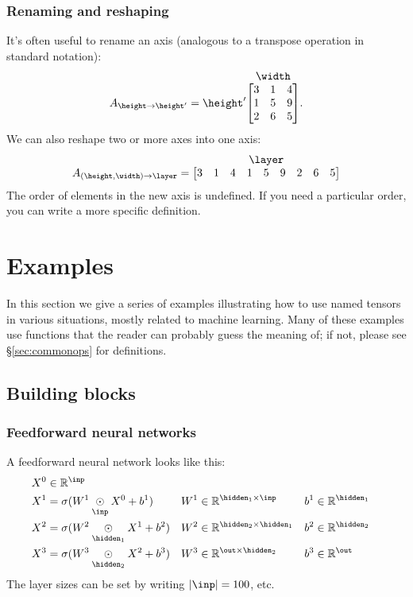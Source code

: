 \documentclass{article}
\makeatletter
\newcommand{\nmatrix}[3]{#1\begin{array}[b]{@{}c@{}}#2\\\begin{bmatrix}#3\end{bmatrix}\end{array}}
\makeatother
\begin{document}
\subsubsection{Renaming and reshaping}

It's often useful to rename an axis (analogous to a transpose operation in standard notation):
\begin{equation*}
A_{\height\rightarrow\height'} = \nmatrix{\height'}{\width}{
  3 & 1 & 4 \\
  1 & 5 & 9 \\
  2 & 6 & 5 \\
}.
\end{equation*}
We can also reshape two or more axes into one axis:
\begin{equation*}
  A_{(\height,\width)\rightarrow\layer} = \nmatrix{}{\layer}{
    3 & 1 & 4 & 1 & 5 & 9 & 2 & 6 & 5
  }
\end{equation*}
The order of elements in the new axis is undefined. If you need a particular order, you can write a more specific definition.

\section{Examples}
\label{sec:examples}

In this section we give a series of examples illustrating how to use named tensors in various situations, mostly related to machine learning. Many of these examples use functions that the reader can probably guess the meaning of; if not, please see \S\ref{sec:commonops} for definitions.

\subsection{Building blocks}

\subsubsection{Feedforward neural networks}

A feedforward neural network looks like this:
\begin{align*}
  X^0 &\in \mathbb{R}^{\inp} \\
  X^1 &= \sigma(W^1 \ndot{\inp} X^0 + b^1) & W^1 &\in \mathbb{R}^{\hidden_1 \times \inp} & b^1 &\in \mathbb{R}^{\hidden_1} \\
  X^2 &= \sigma(W^2 \ndot{\hidden_1} X^1 + b^2) & W^2 &\in \mathbb{R}^{\hidden_2 \times \hidden_1} & b^2 &\in \mathbb{R}^{\hidden_2} \\
  X^3 &= \sigma(W^3 \ndot{\hidden_2} X^2 + b^3) & W^3 &\in \mathbb{R}^{\out \times \hidden_2} & b^3 &\in \mathbb{R}^{\out}
\end{align*}
The layer sizes can be set by writing $|\inp| = 100$, etc.
\end{document}
